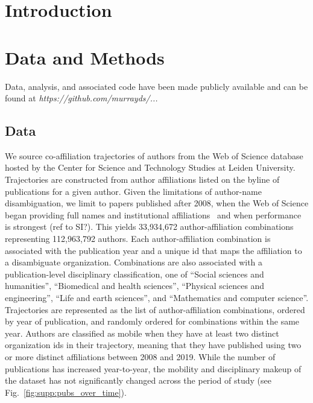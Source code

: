 \documentclass[12pt]{article} %
\begin{document}
%
%
\section{Introduction}\label{sec:introduction} %




%
%
\section{Data and Methods}
\label{sec:datamethods} %

Data, analysis, and associated code have been made publicly available and can be found at \textit{https://github.com/murrayds/...}


\subsection*{Data}
We source co-affiliation trajectories of authors from the Web of Science database hosted by the Center for Science and Technology Studies at Leiden University. 
Trajectories are constructed from author affiliations listed on the byline of publications for a given author.
Given the limitations of author-name disambiguation, we limit to papers published after 2008, when the Web of Science began providing full names and institutional affiliations~\cite{caron2014disambiguation} and when performance is strongest (ref to SI?). 
This yields 33,934,672 author-affiliation combinations representing 112,963,792 authors. 
Each author-affiliation combination is associated with the publication year and a unique id that maps the affiliation to a disambiguate organization. 
Combinations are also associated with a publication-level disciplinary classification, one of ``Social sciences and humanities'',
``Biomedical and health sciences'', ``Physical sciences and engineering'', ``Life and earth sciences'', and ``Mathematics and computer science''.
Trajectories are represented as the list of author-affiliation combinations, ordered by year of publication, and randomly ordered for combinations within the same year. 
Authors are classified as mobile when they have at least two distinct organization ids in their trajectory, meaning that they have published using two or more distinct affiliations between 2008 and 2019.
While the number of publications has increased year-to-year, the mobility and disciplinary makeup of the dataset has not significantly changed across the period of study (see Fig.~\ref{fig:supp:pubs_over_time}).
\end{document}
